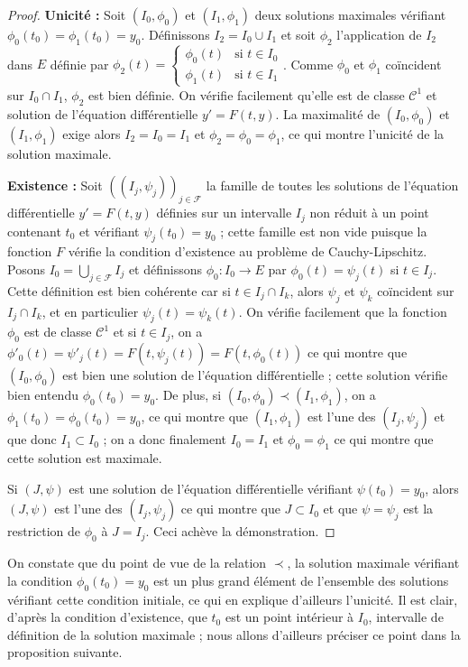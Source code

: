 \begin{proof} 
\textbf{Unicité :} Soit $(I_0,\phi_0)$ et
$(I_1,\phi_1)$ deux solutions maximales vérifiant
$\phi_0(t_0) = \phi_1(t_0) = y_0$.
Définissons $I_2 = I_0 \cup I_1$ et soit
$\phi_2$ l'application de $I_2$ dans $E$ définie par
$\phi_2(t) = \begin{cases} 
\phi_0(t) & \text{si } t \in I_0 \\
\phi_1(t) & \text{si } t \in I_1
\end{cases}$. Comme $\phi_0$ et $\phi_1$ coïncident
sur $I_0 \cap I_1$, $\phi_2$ est bien définie. On
vérifie facilement qu'elle est de classe $\mathcal{C}^1$ et solution de
l'équation différentielle $y' = F(t,y)$. La maximalité de
$(I_0,\phi_0)$ et $(I_1,\phi_1)$ exige alors
$I_2 = I_0 = I_1$ et $\phi_2 =
\phi_0 = \phi_1$, ce qui montre l'unicité de la solution
maximale.

\textbf{Existence :} Soit $((I_j,\psi_j))_{j \in \mathcal{F}}$ la
famille de toutes les solutions de l'équation différentielle $y' = F(t,y)$
définies sur un intervalle $I_j$ non réduit à un point contenant
$t_0$ et vérifiant $\psi_j(t_0) = y_0$ ;
cette famille est non vide puisque la fonction $F$ vérifie la condition
d'existence au problème de Cauchy-Lipschitz. Posons $I_0 = \bigcup_{j \in \mathcal{F}} I_j$ et définissons $\phi_0 : I_0 \rightarrow E$
par $\phi_0(t) = \psi_j(t)$ si $t \in I_j$. Cette
définition est bien cohérente car si $t \in I_j \cap I_k$,
alors $\psi_j$ et $\psi_k$ coïncident sur $I_j \cap I_k$, et en particulier $\psi_j(t) = \psi_k(t)$. On
vérifie facilement que la fonction $\phi_0$ est de classe
$\mathcal{C}^1$ et si $t \in I_j$, on a $\phi'_0(t) =
\psi'_j(t) = F(t,\psi_j(t)) = F(t,\phi_0(t))$ ce qui
montre que $(I_0,\phi_0)$ est bien une solution de
l'équation différentielle ; cette solution vérifie bien entendu
$\phi_0(t_0) = y_0$. De plus, si
$(I_0,\phi_0) \prec (I_1,\phi_1)$, on a
$\phi_1(t_0) = \phi_0(t_0) = y_0$,
ce qui montre que $(I_1,\phi_1)$ est l'une des
$(I_j,\psi_j)$ et que donc $I_1 \subset I_0$ ; on
a donc finalement $I_0 = I_1$ et $\phi_0 =
\phi_1$ ce qui montre que cette solution est maximale.

Si $(J,\psi)$ est une solution de l'équation différentielle vérifiant
$\psi(t_0) = y_0$, alors $(J,\psi)$ est l'une des
$(I_j,\psi_j)$ ce qui montre que $J \subset I_0$ et que $\psi = \psi_j$ est la restriction de $\phi_0$ à $J = I_j$.
Ceci achève la démonstration.
\end{proof}

\begin{rem}
On constate que du point de vue de la relation $\prec$, la
solution maximale vérifiant la condition $\phi_0(t_0) =
y_0$ est un plus grand élément de l'ensemble des solutions
vérifiant cette condition initiale, ce qui en explique d'ailleurs
l'unicité. Il est clair, d'après la condition d'existence, que
$t_0$ est un point intérieur à $I_0$, intervalle de
définition de la solution maximale ; nous allons d'ailleurs préciser ce
point dans la proposition suivante.
\end{rem}

